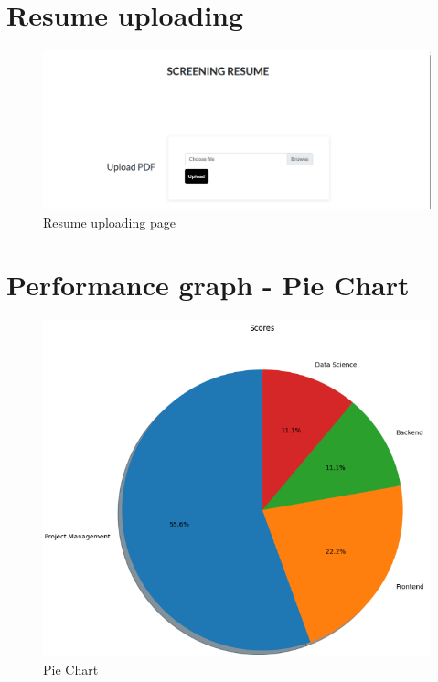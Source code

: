 \documentclass[12 pt, oneside]{book}
\begin{document}
\section{Resume uploading}
\begin{figure}[h]
 \begin{center}
		\includegraphics[width = 10 cm]{uploading.png}
		\caption{Resume uploading page}
		\label{ab}	\end{center}
\end{figure}

\section{Performance graph - Pie Chart}
\begin{figure}[h]
 \begin{center}
		\includegraphics[width = 10 cm]{piechart_img.png}
		\caption{Pie Chart}
		\label{ab}	\end{center}
\end{figure}

\end{document}
